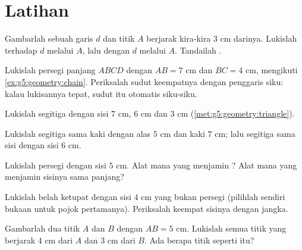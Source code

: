 \section{Latihan}

\begin{exercise}[$\star$]\label{exo:g5:geometry:1}
Gambarlah sebuah garis $d$ dan titik $A$ berjarak kira-kira $3$ cm
darinya. Lukislah  terhadap $d$ melalui $A$, lalu
 dengan $d$ melalui $A$. Tandailah .
\end{exercise}

\begin{exercise}[$\star$]\label{exo:g5:geometry:2}
Lukislah persegi panjang $ABCD$ dengan $AB = 7$ cm dan $BC = 4$ cm,
mengikuti \cref{ex:g5:geometry:chain}. Periksalah sudut keempatnya
dengan penggaris siku: kalau lukisannya tepat, sudut itu otomatis
siku-siku.
\end{exercise}

\begin{exercise}[$\star$]\label{exo:g5:geometry:3}
Lukislah segitiga dengan sisi $7$ cm, $6$ cm dan $3$ cm
(\cref{met:g5:geometry:triangle}).
\end{exercise}

\begin{exercise}[$\star$]\label{exo:g5:geometry:4}
Lukislah segitiga sama kaki dengan alas $5$ cm dan kaki $7$ cm; lalu
segitiga sama sisi dengan sisi $6$ cm.
\end{exercise}

\begin{exercise}[$\star$]\label{exo:g5:geometry:5}
Lukislah persegi dengan sisi $5$ cm. Alat mana yang menjamin ? Alat mana yang menjamin sisinya sama panjang?
\end{exercise}

\begin{exercise}[$\star$]\label{exo:g5:geometry:6}
Lukislah belah ketupat dengan sisi $4$ cm yang bukan persegi
(pilihlah sendiri bukaan untuk pojok pertamanya). Periksalah keempat
sisinya dengan jangka.
\end{exercise}

\begin{exercise}[$\star$]\label{exo:g5:geometry:7}
Gambarlah dua titik $A$ dan $B$ dengan $AB = 5$ cm. Lukislah semua
titik yang berjarak $4$ cm dari $A$ dan $3$ cm dari $B$. Ada berapa
titik seperti itu?
\end{exercise}

